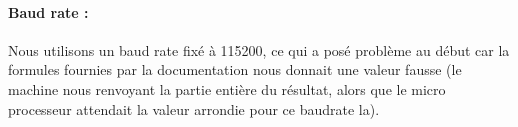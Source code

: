 \paragraph{Baud rate :}
Nous utilisons un baud rate fixé à 115200, ce qui a posé problème au
début car la formules fournies par la documentation nous donnait une
valeur fausse (le machine nous renvoyant la partie entière du
résultat, alors que le micro processeur attendait la valeur arrondie
pour ce baudrate la).


